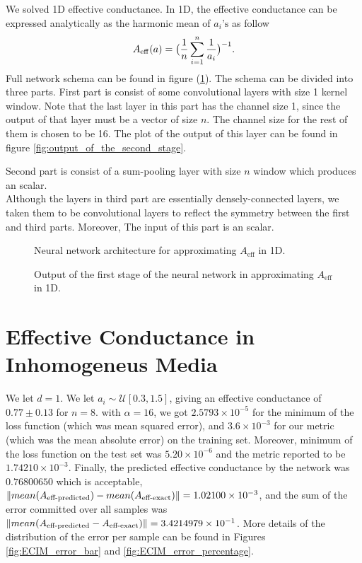 \pagebreak
We solved 1D effective conductance. In 1D, the effective conductance can be expressed analytically as the harmonic mean of $a_i\text{'s}$ as follow
\begin{equation}
\label{ECIM_AnalythicalSolution}
A_{\operatorname{eff}}(a) = \big( \frac{1}{n} \sum_{i=1}^{n} \frac{1}{a_i}\big) ^{-1}.
\end{equation}
Full network schema can be found in figure (\ref{fig:ECIM_NN_Structure}). The schema can be divided into three parts. First part is consist of some convolutional layers with size 1 kernel window. Note that the last layer in this part has the channel size 1, since the output of that layer must be a vector of size $n$. The channel size for the rest of them is chosen to be 16. %
The plot of the output of this layer can be found in figure \eqref{fig:output_of_the_second_stage}.

Second part is consist of a sum-pooling layer with size $n$ window which produces an scalar.\\
Although the layers in third part are essentially densely-connected layers, we taken them to be convolutional layers to reflect the symmetry between the first and third parts. Moreover, The input of this part is an scalar.
\begin{figure}[h!]
	{
	\centering
	\def\svgwidth{\columnwidth}
	\scalebox{.5}{}
	\caption{Neural network architecture for approximating $A_\text{eff}$ in 1D.}
	\label{fig:ECIM_NN_Structure}
	}
\end{figure}
\begin{figure}[h!]
	{
	\centering
	\def\svgwidth{\columnwidth}
	\scalebox{.5}{}
	\caption{Output of the first stage of the neural network in approximating $A_\text{eff}$ in 1D.}
	\label{fig:output_of_the_second_stage}
	}
\end{figure}
\pagebreak
\section{Effective Conductance in Inhomogeneus Media}
We let $d=1$. We let $a_i \sim \mathscr{U} [ 0.3, 1.5 ]$, giving an effective conductance of $0.77 \pm 0.13$ for $n = 8$. with $\alpha = 16$, we got $2.5793 \times 10^{-5}$ for the minimum of the loss function (which was mean squared error), and $3.6 \times 10^{-3}$ for our metric (which was the mean absolute error) on the training set. Moreover, minimum of the loss function on the test set was $5.20 \times 10^{-6}$ and the metric reported to be $1.74210 \times 10 ^ {-3}$. Finally, the predicted effective conductance by the network was $0.76800650$ which is acceptable, $\left\lVert mean(A_{\text{eff-predicted}}) - mean(A_{\text{eff-exact}})\right\rVert = 1.02100 \times 10^{-3}$, and the sum of the error committed over all samples was $\left\lVert mean(A_{\text{eff-predicted}} -A_{\text{eff-exact}})\right\rVert = 3.4214979 \times 10^{-1}$. More details of the distribution of the error per sample can be found in Figures \eqref{fig:ECIM_error_bar} and \eqref{fig:ECIM_error_percentage}.

